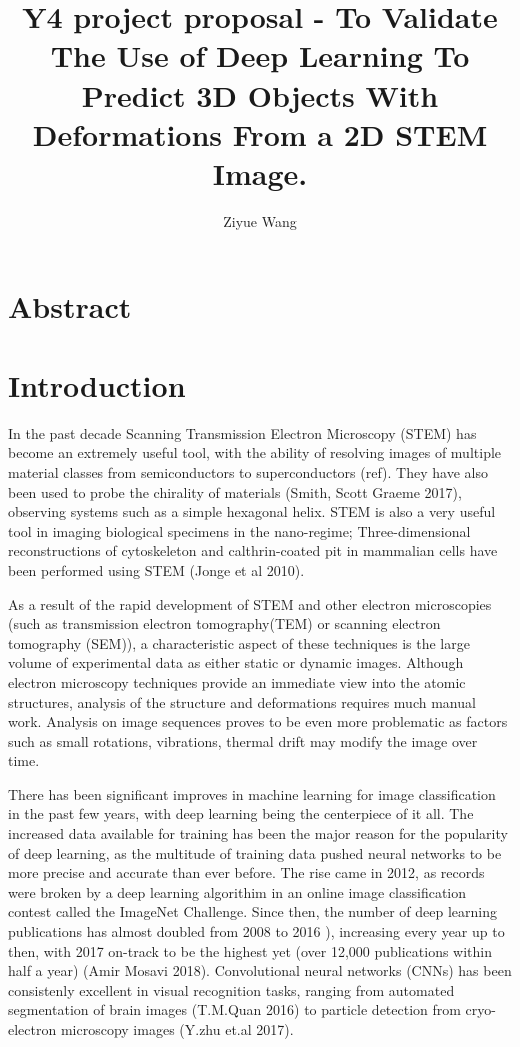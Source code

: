 \documentclass{cookedoc}
\begin{document}
	\onecolumn
	
	\title{\Large Y4 project proposal - To Validate The Use of Deep Learning To Predict 3D Objects With Deformations From a 2D STEM Image.}
	\author{\large Ziyue Wang}
	
	\address{Supervisor Dr Wolfgang Theis}
	
	
	\maketitle
	\section{Abstract}
	
	\section{Introduction}
	
	In the past decade Scanning Transmission Electron Microscopy (STEM) has become an extremely useful tool, with the ability of resolving images of multiple material classes from semiconductors to superconductors (ref). They have also been used to probe the chirality of materials (Smith, Scott Graeme 2017), observing systems such as a simple hexagonal helix. STEM is also a very useful tool in imaging biological specimens in the nano-regime; Three-dimensional reconstructions of cytoskeleton and calthrin-coated pit in mammalian cells have been performed using STEM (Jonge et al 2010). 
	
	As a result of the rapid development of STEM and other electron microscopies (such as transmission electron tomography(TEM) or scanning electron tomography (SEM)), a characteristic aspect of these techniques is the large volume of experimental data as either static or dynamic images. Although electron microscopy techniques provide an immediate view into the atomic structures, analysis of the structure and deformations requires much manual work. Analysis on image sequences proves to be even more problematic as factors such as small rotations, vibrations, thermal drift may modify the image over time. 
	
	There has been significant improves in machine learning for image classification in the past few years, with deep learning being the centerpiece of it all. The increased data available for training has been the major reason for the popularity of deep learning, as the multitude of training data pushed neural networks to be more precise and accurate than ever before. The rise came in 2012, as records were broken by a deep learning algorithim in an online image classification contest called the ImageNet Challenge. Since then, the number of deep learning publications has almost doubled from 2008 to 2016 ), increasing every year up to then, with 2017 on-track to be the highest yet (over 12,000 publications within half a year) (Amir Mosavi 2018). Convolutional neural networks (CNNs) has been consistenly excellent in visual recognition tasks, ranging from automated segmentation of brain images (T.M.Quan 2016) to particle detection from cryo-electron microscopy images (Y.zhu et.al 2017). 
	
\end{document}
